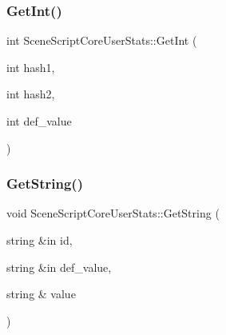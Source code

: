 \hypertarget{class_scene_script_core_user_stats_a325474f572b52d51a7b041458160edc9}{}\label{class_scene_script_core_user_stats_a325474f572b52d51a7b041458160edc9} 
\subsubsection{\texorpdfstring{Get\+Int()}{GetInt()}\hspace{0.1cm}{\footnotesize\ttfamily [2/2]}}
{\footnotesize\ttfamily int Scene\+Script\+Core\+User\+Stats\+::\+Get\+Int (\begin{DoxyParamCaption}\item[{int}]{hash1,  }\item[{int}]{hash2,  }\item[{int}]{def\+\_\+value }\end{DoxyParamCaption})}

\hypertarget{class_scene_script_core_user_stats_aac27f1605a4967aba3036cfc67273146}{}\label{class_scene_script_core_user_stats_aac27f1605a4967aba3036cfc67273146} 
\subsubsection{\texorpdfstring{Get\+String()}{GetString()}\hspace{0.1cm}{\footnotesize\ttfamily [1/2]}}
{\footnotesize\ttfamily void Scene\+Script\+Core\+User\+Stats\+::\+Get\+String (\begin{DoxyParamCaption}\item[{string \&in}]{id,  }\item[{string \&in}]{def\+\_\+value,  }\item[{string \&}]{value }\end{DoxyParamCaption})}

\hypertarget{class_scene_script_core_user_stats_ac1b0f3cb7e0d9051954697a0bd44552b}{}\label{class_scene_script_core_user_stats_ac1b0f3cb7e0d9051954697a0bd44552b} 
